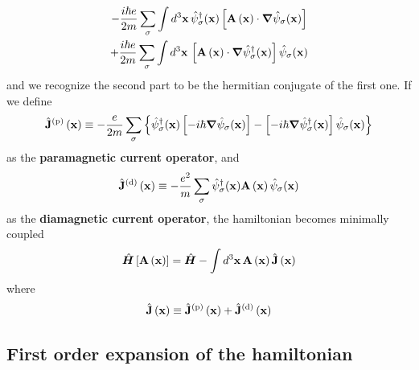 \begin{multline*}
	- \frac{i\hbar e}{2m} \sum_\sigma \int d^3 \mathbf{x} \, \hat{\psi}_\sigma^\dagger (\mathbf{x}) \left[{\mathbf{A}\left({\mathbf{x}}\right) \cdot\grad \hat{\psi}_\sigma (\mathbf{x}) \vphantom{\psi^\dagger}}\right] \\ 
	+ \frac{i\hbar e}{2m} \sum_\sigma \int d^3 \mathbf{x} \,  \left[{\mathbf{A}\left({\mathbf{x}}\right) \cdot\grad \hat{\psi}_\sigma^\dagger (\mathbf{x})}\right] \hat{\psi}_\sigma (\mathbf{x})
\end{multline*}
and we recognize the second part to be the hermitian conjugate of the first one. If we define
\begin{equation}\label{eq:paramagnetic current}
	\hat{\mathbf{J}}^{(\mathrm{p})} \left({\mathbf{x}}\right) \equiv - \frac{e}{2m} \sum_\sigma \left\{{
		\hat{\psi}_\sigma^\dagger (\mathbf{x}) \left[{-i\hbar\grad \hat{\psi}_\sigma (\mathbf{x}) \vphantom{\psi^\dagger}}\right] - 
		\left[{-i\hbar\grad \hat{\psi}_\sigma^\dagger (\mathbf{x})}\right] \hat{\psi}_\sigma (\mathbf{x})
	}\right\}
\end{equation}
as the \textbf{paramagnetic current operator}, and
\begin{equation}\label{eq:diamagnetic current}
	\hat{\mathbf{J}}^{(\mathrm{d})} \left({\mathbf{x}}\right) \equiv - \frac{e^2}{m} \sum_\sigma \hat{\psi}_\sigma^\dagger (\mathbf{x}) \mathbf{A}\left({\mathbf{x}}\right) \hat{\psi}_\sigma (\mathbf{x})
\end{equation}
as the \textbf{diamagnetic current operator}, the hamiltonian becomes minimally coupled
\begin{equation}\label{eq:minimally coupled hamiltonian}
	\hat{\bm H} \left[{\mathbf{A}\left({\mathbf{x}}\right)}\right] = \hat{\bm H} - \int d^3\mathbf{x} \, \mathbf{A}\left({\mathbf{x}}\right) \hat{\mathbf{J}} \left({\mathbf{x}}\right)
\end{equation}
where
\[
	\hat{\mathbf{J}} \left({\mathbf{x}}\right) \equiv \hat{\mathbf{J}}^{(\mathrm{p})} \left({\mathbf{x}}\right) + \hat{\mathbf{J}}^{(\mathrm{d})} \left({\mathbf{x}}\right)
\]

\subsection{First order expansion of the hamiltonian}

